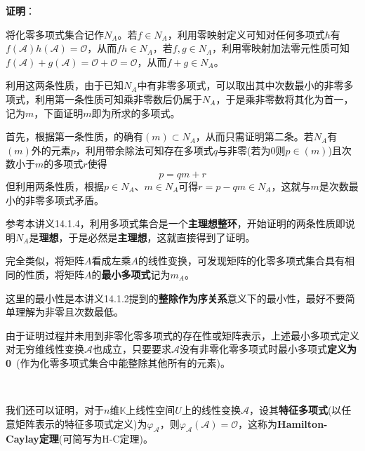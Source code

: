 \documentclass[a4paper,UTF8,fontset=windows,AutoFakeBold]{ctexart}
\newcommand*{\ma}{\mathcal{A}}
\newcommand*{\mo}{\mathcal{O}}
\newcommand*{\note}{\noindent *}
\newcommand{\proo}[1]{{\vspace{5pt}\kaishu\noindent\textbf{证明}：\vspace{-3pt}
\begin{compactitem}
    \item[] #1
\end{compactitem}
}}
\begin{document}
\proo{
    将化零多项式集合记作$N_A$。若$f\in N_A$，利用零映射定义可知对任何多项式$h$有$f(\ma)h(\ma)=\mo$，从而$fh\in N_A$，若$f,g\in N_A$，利用零映射加法零元性质可知$f(\ma)+g(\ma)=\mo+\mo=\mo$，从而$f+g\in N_A$。

    利用这两条性质，由于已知$N_A$中有非零多项式，可以取出其中次数最小的非零多项式，利用第一条性质可知乘非零数后仍属于$N_A$，于是乘非零数将其化为首一，记为$m$，下面证明$m$即为所求的多项式。

    首先，根据第一条性质，的确有$(m)\subset N_A$，从而只需证明第二条。若$N_A$有$(m)$外的元素$p$，利用带余除法可知存在多项式$q$与非零(若为0则$p\in(m)$)且次数小于$m$的多项式$r$使得
    $$p=qm+r$$
    但利用两条性质，根据$p\in N_A$、$m\in N_A$可得$r=p-qm\in N_A$，这就与$m$是次数最小的非零多项式矛盾。

    \note 参考本讲义14.1.4，利用多项式集合是一个\textbf{主理想整环}，开始证明的两条性质即说明$N_A$是\textbf{理想}，于是必然是\textbf{主理想}，这就直接得到了证明。
}

完全类似，将矩阵$A$看成左乘$A$的线性变换，可发现矩阵的化零多项式集合具有相同的性质，将矩阵$A$的\textbf{最小多项式}记为$m_A$。

\note 这里的最小性是本讲义14.1.2提到的\textbf{整除作为序关系}意义下的最小性，最好不要简单理解为非零且次数最低。

\note 由于证明过程并未用到非零化零多项式的存在性或矩阵表示，上述最小多项式定义对无穷维线性变换$\ma$也成立，只要要求$\ma$没有非零化零多项式时最小多项式\textbf{定义为0}\ (作为化零多项式集合中能整除其他所有的元素)。


\

我们还可以证明，对于$n$维$\mathbb{K}$上线性空间$U$上的线性变换$\ma$，设其\textbf{特征多项式}(以任意矩阵表示的特征多项式定义)为$\varphi_\ma$，则$\varphi_\ma(\ma)=\mo$，这称为\textbf{Hamilton-Caylay定理}(可简写为H-C定理)。
\end{document}
